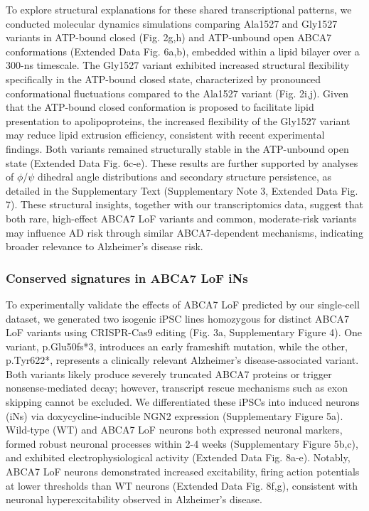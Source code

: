 To explore structural explanations for these shared transcriptional patterns, we conducted molecular dynamics simulations comparing Ala1527 and Gly1527 variants in ATP-bound closed (Fig. 2g,h) and ATP-unbound open ABCA7 conformations (Extended Data Fig. 6a,b), embedded within a lipid bilayer over a 300-ns timescale. The Gly1527 variant exhibited increased structural flexibility specifically in the ATP-bound closed state, characterized by pronounced conformational fluctuations compared to the Ala1527 variant (Fig. 2i,j). Given that the ATP-bound closed conformation is proposed to facilitate lipid presentation to apolipoproteins\supercite{LeThiMy2022-dp,Fang2025}, the increased flexibility of the Gly1527 variant may reduce lipid extrusion efficiency, consistent with recent experimental findings\supercite{Fang2025}. Both variants remained structurally stable in the ATP-unbound open state (Extended Data Fig. 6c-e). These results are further supported by analyses of $\phi$/$\psi$ dihedral angle distributions and secondary structure persistence, as detailed in the Supplementary Text (Supplementary Note 3, Extended Data Fig. 7). These structural insights, together with our transcriptomics data, suggest that both rare, high-effect ABCA7 LoF variants and common, moderate-risk variants may influence AD risk through similar ABCA7-dependent mechanisms, indicating broader relevance to Alzheimer's disease risk.

\subsubsection{Conserved signatures in ABCA7 LoF iNs}
To experimentally validate the effects of ABCA7 LoF predicted by our single-cell dataset, we generated two isogenic iPSC lines homozygous for distinct ABCA7 LoF variants using CRISPR-Cas9 editing (Fig. 3a, Supplementary Figure 4). One variant, p.Glu50fs*3, introduces an early frameshift mutation, while the other, p.Tyr622*, represents a clinically relevant Alzheimer's disease-associated variant\supercite{Steinberg2015-mu}. Both variants likely produce severely truncated ABCA7 proteins or trigger nonsense-mediated decay; however, transcript rescue mechanisms such as exon skipping cannot be excluded\supercite{De_Roeck2017-hv}. We differentiated these iPSCs into induced neurons (iNs) via doxycycline-inducible NGN2 expression\supercite{Ho2016-kz} (Supplementary Figure 5a). Wild-type (WT) and ABCA7 LoF neurons both expressed neuronal markers, formed robust neuronal processes within 2-4 weeks (Supplementary Figure 5b,c), and exhibited electrophysiological activity (Extended Data Fig. 8a-e). Notably, ABCA7 LoF neurons demonstrated increased excitability, firing action potentials at lower thresholds than WT neurons (Extended Data Fig. 8f,g), consistent with neuronal hyperexcitability observed in Alzheimer's disease.

